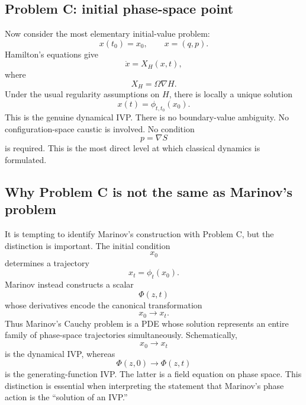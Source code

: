 \subsection{Problem C: initial phase-space point}
Now consider the most elementary initial-value problem:
\begin{equation}
x(t_0)=x_0,
\qquad
x=(q,p).
\end{equation}
Hamilton's equations give
\begin{equation}
\dot x=X_H(x,t),
\end{equation}
where
\begin{equation}
X_H=\Omega\nabla H.
\end{equation}
Under the usual regularity assumptions on \(H\), there is locally a unique
solution
\begin{equation}
x(t)=\phi_{t,t_0}(x_0).
\end{equation}
This is the genuine dynamical IVP.
There is no boundary-value ambiguity.
No configuration-space caustic is involved.
No condition
\begin{equation}
p=\nabla S
\end{equation}
is required.
This is the most direct level at which classical dynamics is formulated.
\subsection{Why Problem C is not the same as Marinov's problem}
It is tempting to identify Marinov's construction with Problem C, but the
distinction is important.
The initial condition
\begin{equation}
x_0
\end{equation}
determines a trajectory
\begin{equation}
x_t=\phi_t(x_0).
\end{equation}
Marinov instead constructs a scalar
\begin{equation}
\Phi(z,t)
\end{equation}
whose derivatives encode the canonical transformation
\begin{equation}
x_0\longrightarrow x_t.
\end{equation}
Thus Marinov's Cauchy problem is a PDE whose solution represents an entire
family of phase-space trajectories simultaneously.
Schematically,
\begin{equation}
\boxed{
x_0
\longrightarrow
x_t
}
\end{equation}
is the dynamical IVP, whereas
\begin{equation}
\boxed{
\Phi(z,0)
\longrightarrow
\Phi(z,t)
}
\end{equation}
is the generating-function IVP.
The latter is a field equation on phase space.
This distinction is essential when interpreting the statement that Marinov's
phase action is the ``solution of an IVP.''
